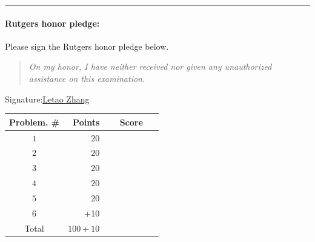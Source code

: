 \documentclass{article}
\theoremstyle{definition}
\def\fline{\rule{0.75\linewidth}{0.5pt}}
\newcommand{\finishline}{\vspace{-15pt}\begin{center}\fline\end{center}}
\begin{document}
\finishline

\paragraph{Rutgers honor pledge:} Please sign the Rutgers honor pledge below. 

\begin{quote}
\emph{On my honor, I have neither received nor given any unauthorized assistance on this
examination.} 
\end{quote}
\hfill{Signature:\underline{Letao Zhang}}

\bigskip

\begin{center}
\begin{tabular}{|c|r|c|}
\hline
Problem. \# & Points & Score \\ \hline\hline
$1$ & 20 & ~~~~~~~~~~~\\  \hline
$2$ & 20 & \\ \hline
$3$ & 20 & \\ \hline
$4$ & 20 & \\ \hline
$5$ & 20 & \\ \hline
$6$ & +10 & \\ \hline
Total & $100 + 10$ & \\ \hline
\end{tabular}
\end{center}

\newpage
\end{document}
